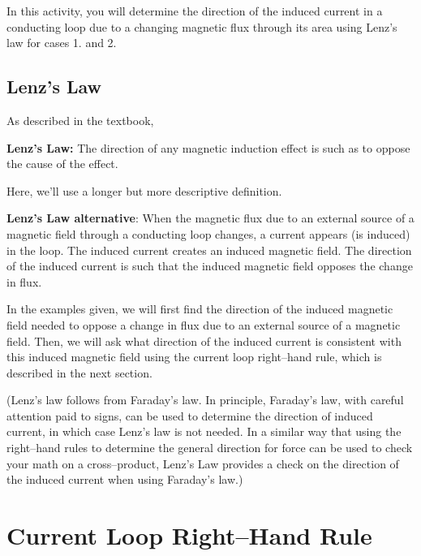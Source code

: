 \documentclass{article}
\begin{document}
In this activity, you will determine the direction of the induced current in a conducting loop due to a changing magnetic flux through its area using Lenz's law for cases 1. and 2.


\newpage

\subsection{Lenz's Law}

As described in the textbook,

{\bf Lenz's Law:} The direction of any magnetic induction effect is such as to oppose the cause of the effect.

Here, we'll use a longer but more descriptive definition.

{\bf Lenz's Law alternative}: When the magnetic flux due to an external source of a magnetic field through a conducting loop changes, a current appears (is induced) in the loop. The induced current creates an induced magnetic field. The direction of the induced current is such that the induced magnetic field opposes the change in flux.

In the examples given, we will first find the direction of the induced magnetic field needed to oppose a change in flux due to an external source of a magnetic field. Then, we will ask what direction of the induced current is consistent with this induced magnetic field using the current loop right--hand rule, which is described in the next section.

(Lenz's law follows from Faraday's law. In principle, Faraday's law, with careful attention paid to signs, can be used to determine the direction of induced current, in which case Lenz's law is not needed. In a similar way that using the right--hand rules to determine the general direction for force can be used to check your math on a cross--product, Lenz's Law provides a check on the direction of the induced current when using Faraday's law.)

\section{Current Loop Right--Hand Rule}
\end{document}
